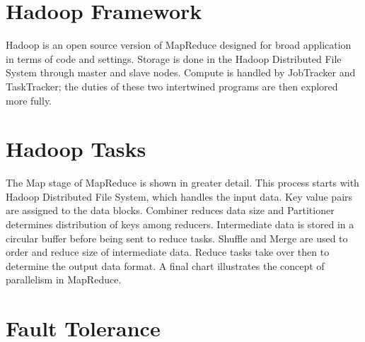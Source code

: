 

\section{Hadoop Framework}

Hadoop is an open source version of MapReduce designed for broad
application in terms of code and settings. Storage is done in the Hadoop
Distributed File System through master and slave nodes. Compute is
handled by JobTracker and TaskTracker; the duties of these two
intertwined programs are then explored more fully.




\section{Hadoop Tasks}

The Map stage of MapReduce is shown in greater detail. This process
starts with Hadoop Distributed File System, which handles the input
data. Key value pairs are assigned to the data blocks. Combiner reduces
data size and Partitioner determines distribution of keys among
reducers. Intermediate data is stored in a circular buffer before being
sent to reduce tasks. Shuffle and Merge are used to order and reduce
size of intermediate data. Reduce tasks take over then to determine the
output data format. A final chart illustrates the concept of parallelism
in MapReduce.




\section{Fault Tolerance}

